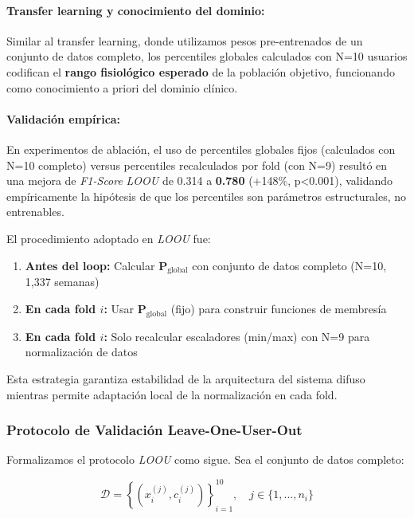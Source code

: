 \paragraph{Transfer learning y conocimiento del dominio:}
Similar al transfer learning, donde utilizamos pesos pre-entrenados de un conjunto de datos completo, los percentiles globales calculados con N=10 usuarios codifican el \textbf{rango fisiológico esperado} de la población objetivo, funcionando como conocimiento a priori del dominio clínico.

\paragraph{Validación empírica:}
En experimentos de ablación, el uso de percentiles globales fijos (calculados con N=10 completo) versus percentiles recalculados por fold (con N=9) resultó en una mejora de \textit{F1-Score} \textit{LOOU} de 0.314 a \textbf{0.780} (+148\%, p<0.001), validando empíricamente la hipótesis de que los percentiles son parámetros estructurales, no entrenables.

El procedimiento adoptado en \textit{LOOU} fue:

\begin{enumerate}
    \item \textbf{Antes del loop:} Calcular \(\mathbf{P}_{\text{global}}\) con conjunto de datos completo (N=10, 1,337 semanas)
    \item \textbf{En cada fold \(i\):} Usar \(\mathbf{P}_{\text{global}}\) (fijo) para construir funciones de membresía
    \item \textbf{En cada fold \(i\):} Solo recalcular escaladores (min/max) con N=9 para normalización de datos
\end{enumerate}

Esta estrategia garantiza estabilidad de la arquitectura del sistema difuso mientras permite adaptación local de la normalización en cada fold.

\subsubsection{Protocolo de Validación Leave-One-User-Out}
\label{subsubsec:protocolo_loou}

Formalizamos el protocolo \textit{LOOU} como sigue. Sea el conjunto de datos completo:

\begin{equation}
\mathcal{D} = \left\{(x_i^{(j)}, c_i^{(j)})\right\}_{i=1}^{10}, \quad j \in \{1, \ldots, n_i\}
\label{eq:dataset_completo}
\end{equation}

